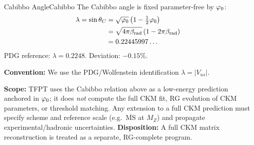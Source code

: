 \begin{corollary}{Cabibbo Angle}{Cabibbo}
The Cabibbo angle is fixed parameter-free by $\varphi_0$:
\begin{equation}
    \begin{aligned}
        \lambda = \sin\theta_C 
        &= \sqrt{\varphi_0}\left(1 - \tfrac{1}{2}\varphi_0\right) \\
        &= \sqrt{4\pi\beta_{\text{rad}}}\left(1 - 2\pi\beta_{\text{rad}}\right) \\
        &= 0.22445997\ldots
    \end{aligned}
\end{equation}
PDG reference: $\lambda = 0.2248$. Deviation: $-0.15\%$.
\end{corollary}

\begin{tcolorbox}[colback=gray!5, colframe=gray!60, 
    title={\textbf{CKM Conventions and Scale (Clarification)}}, fonttitle=\bfseries\small]
\textbf{Convention:} We use the PDG/Wolfenstein identification $\lambda = |V_{us}|$.

\textbf{Scope:} TFPT uses the Cabibbo relation above as a low-energy prediction anchored in $\varphi_0$; it does \emph{not} compute the full CKM fit, RG evolution of CKM parameters, or threshold matching.
Any extension to a full CKM prediction must specify scheme and reference scale (e.g.\ $\overline{\mathrm{MS}}$ at $M_Z$) and propagate experimental/hadronic uncertainties.
\textbf{Disposition:} A full CKM matrix reconstruction is treated as a separate, RG-complete program.
\end{tcolorbox}

